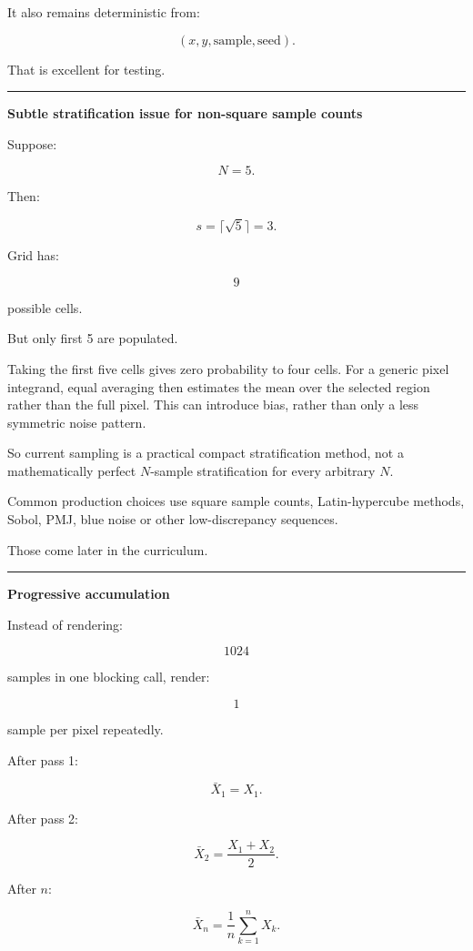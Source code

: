 It also remains deterministic from:

\[
(x,y,\text{sample},\text{seed}).
\]

That is excellent for testing.

\begin{center}\rule{0.5\linewidth}{0.5pt}\end{center}

\textbf{Subtle stratification issue for non-square sample counts}

Suppose:

\[
N=5.
\]

Then:

\[
s=\lceil\sqrt5\rceil=3.
\]

Grid has:

\[
9
\]

possible cells.

But only first 5 are populated.

Taking the first five cells gives zero probability to four cells. For a generic pixel integrand, equal averaging then estimates the mean over the selected region rather than the full pixel. This can introduce bias, rather than only a less symmetric noise pattern.

So current sampling is a practical compact stratification method, not a mathematically perfect \(N\)-sample stratification for every arbitrary \(N\).

Common production choices use square sample counts, Latin-hypercube methods, Sobol, PMJ, blue noise or other low-discrepancy sequences.

Those come later in the curriculum.

\begin{center}\rule{0.5\linewidth}{0.5pt}\end{center}

\textbf{Progressive accumulation}

Instead of rendering:

\[
1024
\]

samples in one blocking call, render:

\[
1
\]

sample per pixel repeatedly.

After pass 1:

\[
\bar X_1=X_1.
\]

After pass 2:

\[
\bar X_2=\frac{X_1+X_2}{2}.
\]

After \(n\):

\[
\boxed{
\bar X_n
=
\frac1n
\sum_{k=1}^nX_k.
}
\]

